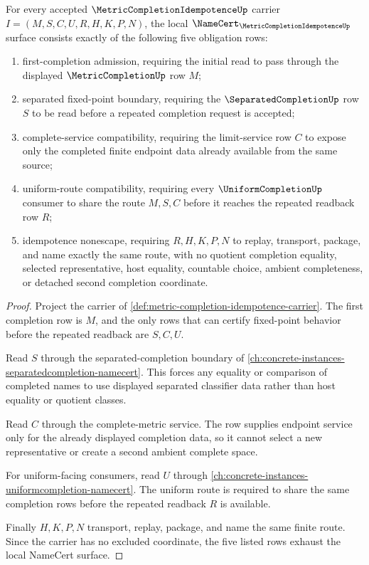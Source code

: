 \begin{theorem}
\label{thm:metric-completion-idempotence-namecert-obligations}
For every accepted $\MetricCompletionIdempotenceUp$ carrier $I=(M,S,C,U,R,H,K,P,N)$, the local $\NameCert_{\MetricCompletionIdempotenceUp}$ surface consists exactly of the following five obligation rows:
\begin{enumerate}
\item first-completion admission, requiring the initial read to pass through the displayed $\MetricCompletionUp$ row $M$;
\item separated fixed-point boundary, requiring the $\SeparatedCompletionUp$ row $S$ to be read before a repeated completion request is accepted;
\item complete-service compatibility, requiring the limit-service row $C$ to expose only the completed finite endpoint data already available from the same source;
\item uniform-route compatibility, requiring every $\UniformCompletionUp$ consumer to share the route $M,S,C$ before it reaches the repeated readback row $R$;
\item idempotence nonescape, requiring $R,H,K,P,N$ to replay, transport, package, and name exactly the same route, with no quotient completion equality, selected representative, host equality, countable choice, ambient completeness, or detached second completion coordinate.
\end{enumerate}
\end{theorem}
\begin{proof}
Project the carrier of \autoref{def:metric-completion-idempotence-carrier}. The first completion row is $M$, and the only rows that can certify fixed-point behavior before the repeated readback are $S,C,U$.

Read $S$ through the separated-completion boundary of \autoref{ch:concrete-instances-separatedcompletion-namecert}. This forces any equality or comparison of completed names to use displayed separated classifier data rather than host equality or quotient classes.

Read $C$ through the complete-metric service. The row supplies endpoint service only for the already displayed completion data, so it cannot select a new representative or create a second ambient complete space.

For uniform-facing consumers, read $U$ through \autoref{ch:concrete-instances-uniformcompletion-namecert}. The uniform route is required to share the same completion rows before the repeated readback $R$ is available.

Finally $H,K,P,N$ transport, replay, package, and name the same finite route. Since the carrier has no excluded coordinate, the five listed rows exhaust the local NameCert surface.
\end{proof}

